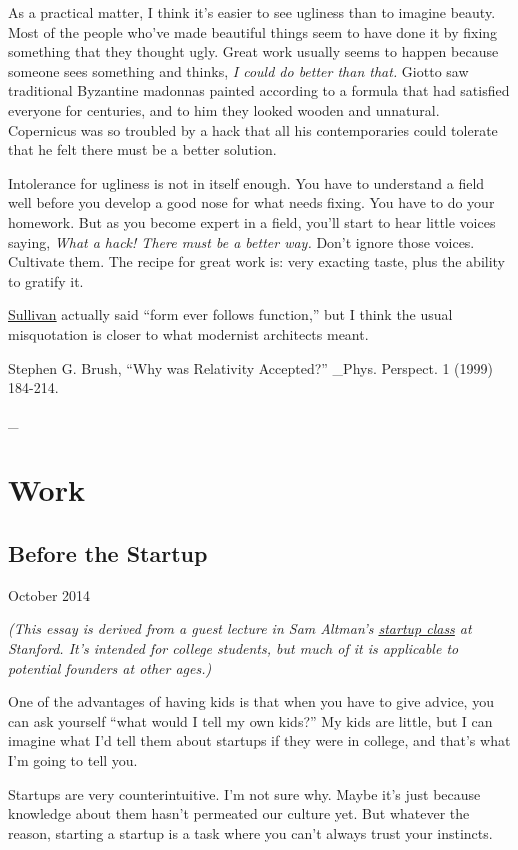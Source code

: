 \documentclass[12pt]{book}
\begin{document}
As a practical matter, I think it's easier to see ugliness than to
imagine beauty. Most of the people who've made beautiful things seem to
have done it by fixing something that they thought ugly. Great work
usually seems to happen because someone sees something and thinks,
\emph{I could do better than that.} Giotto saw traditional Byzantine
madonnas painted according to a formula that had satisfied everyone for
centuries, and to him they looked wooden and unnatural. Copernicus was
so troubled by a hack that all his contemporaries could tolerate that he
felt there must be a better solution.

Intolerance for ugliness is not in itself enough. You have to understand
a field well before you develop a good nose for what needs fixing. You
have to do your homework. But as you become expert in a field, you'll
start to hear little voices saying, \emph{What a hack! There must be a
better way.} Don't ignore those voices. Cultivate them. The recipe for
great work is: very exacting taste, plus the ability to gratify it.


\href{https://sep.turbifycdn.com/ty/cdn/paulgraham/sullivan.html?t=1688221954&}{Sullivan}
actually said ``form ever follows function,'' but I think the usual
misquotation is closer to what modernist architects meant.

Stephen G. Brush, ``Why was Relativity Accepted?'' \_Phys. Perspect. 1
(1999) 184-214.

\_
\part{Work}
\chapter{Before the Startup}

October 2014

\emph{(This essay is derived from a guest lecture in Sam Altman's
\href{http://startupclass.samaltman.com/}{startup class} at Stanford.
It's intended for college students, but much of it is applicable to
potential founders at other ages.)}

One of the advantages of having kids is that when you have to give
advice, you can ask yourself ``what would I tell my own kids?'' My kids
are little, but I can imagine what I'd tell them about startups if they
were in college, and that's what I'm going to tell you.

Startups are very counterintuitive. I'm not sure why. Maybe it's just
because knowledge about them hasn't permeated our culture yet. But
whatever the reason, starting a startup is a task where you can't always
trust your instincts.
\end{document}
